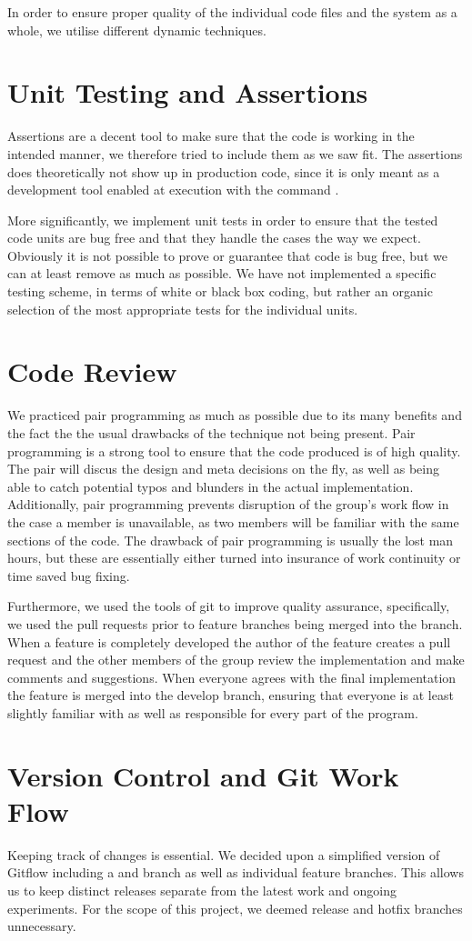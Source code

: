 In order to ensure proper quality of the individual code files and the system as a whole, we utilise different dynamic techniques.

\section{Unit Testing and Assertions}
Assertions are a decent tool to make sure that the code is working in the intended manner, we therefore tried to include them as we saw fit. The assertions does theoretically not show up in production code, since it is only meant as a development tool enabled at execution with the command .

More significantly, we implement unit tests in order to ensure that the tested code units are bug free and that they handle the cases the way we expect. Obviously it is not possible to prove or guarantee that code is bug free, but we can at least remove as much as possible. We have not implemented a specific testing scheme, in terms of white or black box coding, but rather an organic selection of the most appropriate tests for the individual units.

\section{Code Review}
We practiced pair programming as much as possible due to its many benefits and the fact the the usual drawbacks of the technique not being present.
Pair programming is a strong tool to ensure that the code produced is of high quality. The pair will discus the design and meta decisions on the fly, as well as being able to catch potential typos and blunders in the actual implementation. Additionally, pair programming prevents disruption of the group's work flow in the case a member is unavailable, as two members will be familiar with the same sections of the code. The drawback of pair programming is usually the lost man hours, but these are essentially either turned into insurance of work continuity or time saved bug fixing.

Furthermore, we used the tools of git to improve quality assurance, specifically, we used the pull requests prior to feature branches being merged into the  branch. When a feature is completely developed the author of the feature creates a pull request and the other members of the group review the implementation and make comments and suggestions. When everyone agrees with the final implementation the feature is merged into the develop branch, ensuring that everyone is at least slightly familiar with as well as responsible for every part of the program.

\section{Version Control and Git Work Flow}
Keeping track of changes is essential. We decided upon a simplified version of Gitflow including a  and  branch as well as individual feature branches. This allows us to keep distinct releases separate from the latest work and ongoing experiments. For the scope of this project, we deemed release and hotfix branches unnecessary.
